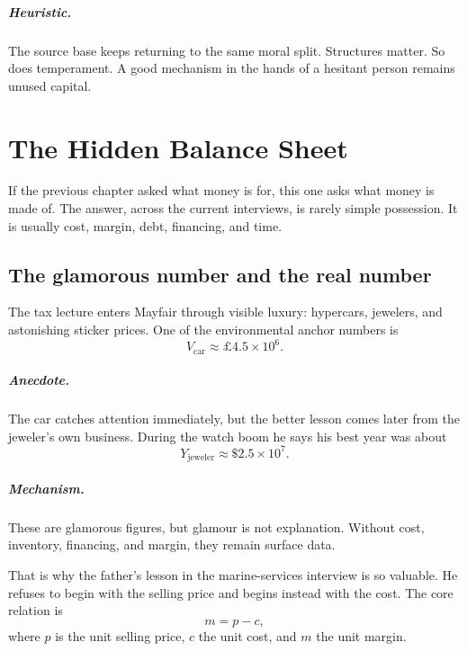 \documentclass[11pt,oneside]{book}
\begin{document}
\paragraph{Heuristic.} The source base keeps returning to the same moral split. Structures matter. So does temperament. A good mechanism in the hands of a hesitant person remains unused capital.

\chapter{The Hidden Balance Sheet}

If the previous chapter asked what money is for, this one asks what money is made of. The answer, across the current interviews, is rarely simple possession. It is usually cost, margin, debt, financing, and time.

\section{The glamorous number and the real number}

The tax lecture enters Mayfair through visible luxury: hypercars, jewelers, and astonishing sticker prices. One of the environmental anchor numbers is
\begin{equation}
V_{\mathrm{car}} \approx \pounds 4.5\times 10^{6}.
\end{equation}

\paragraph{Anecdote.} The car catches attention immediately, but the better lesson comes later from the jeweler's own business. During the watch boom he says his best year was about
\begin{equation}
Y_{\mathrm{jeweler}} \approx \$2.5\times 10^{7}.
\end{equation}

\paragraph{Mechanism.} These are glamorous figures, but glamour is not explanation. Without cost, inventory, financing, and margin, they remain surface data.

That is why the father's lesson in the marine-services interview is so valuable. He refuses to begin with the selling price and begins instead with the cost. The core relation is
\begin{equation}
m = p-c,
\end{equation}
where \(p\) is the unit selling price, \(c\) the unit cost, and \(m\) the unit margin.
\end{document}

